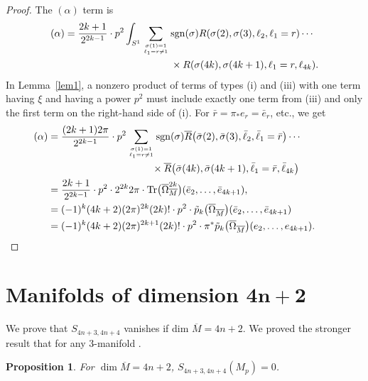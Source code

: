 \documentclass[10pt,a4paper]{amsart}
\numberwithin{equation}{section}
\newtheorem{Proposition}[Theorem]{Proposition}
\theoremstyle{definition}
\newcommand{\Tr}{{\rm Tr}}
\newcommand{\bo}{\overline\Omega}
\newcommand{\bom}{\bo_{\overline M}}
\newcommand{\bxi}{\xi}
\newcommand{\br}{ R}
\newcommand{\ocs}{\widetilde{{\rm CS}}}
\newcommand{\sgn}{{\rm sgn}}
\newcommand{\ints}{\int_{S^1}}
\newcommand{\om}{\overline{M}}
\newcommand{\omp}{M_p}
\begin{document}
\begin{proof}
The $(\alpha)$ term is
\begin{align*}
\begin{split}
(\alpha)= \frac{2k+1}{2^{2k-1}}\cdot p^2\ints \sum_{\sigma(1) = 1\atop \ell_1 = r\neq 1}{}& \sgn(\sigma)
\br(\sigma(2), \sigma(3), \ell_2, \ell_1 = r)\cdots\\
& \times
 \br(\sigma(4k),\sigma(4k+1), \ell_1 =r, \ell_{4k}).\nonumber
\end{split}
 \end{align*}
 In Lemma~\ref{lem1},
 a nonzero product of terms of types (i) and (iii)
 with one term having $\bxi$ and having a power $p^2$ must
include exactly one term from (iii) and only the first term on the right-hand side of (i).
For $\bar r = \pi_* e_r = \bar e_r$, etc., we get
 \begin{align*}(\alpha)
&= \frac{(2k+1)2\pi}{2^{2k-1}}\cdot p^2
 \sum_{\sigma(1) = 1\atop \ell_1 = r\neq 1} \sgn(\sigma)
\overline{R}\bigl(\bar\sigma(2), \bar\sigma(3), \bar\ell_2, \bar\ell_1 = \bar r\bigr)\cdots \\
&\hphantom{= \frac{(2k+1)2\pi}{2^{2k-1}}\cdot p^2
 \sum_{\sigma(1) = 1\atop \ell_1 = r\neq 1}}{}
\times
 \overline{R}\bigl(\bar\sigma(4k),\bar\sigma(4k+1), \bar\ell_1 =\bar r, \bar \ell_{4k}\bigr)\nonumber\\
 &= \frac{2k+1}{2^{2k-1}}\cdot p^2 \cdot 2^{2k}2\pi\cdot \Tr\bigl(\bom^{2k}\bigr)(\bar e_2,\dots, \bar e_{4k+1}),\\
 &= (-1)^k (4k+2)(2\pi)^{2k}(2k)!\cdot p^2 \cdot \tilde p_k\bigl(\bom\bigr)
 (\bar e_2,\dots, \bar e_{4k+1})\\
 &= (-1)^k (4k+2)(2\pi)^{2k+1}(2k)!\cdot
p^2 \cdot \pi^* \tilde p_k\bigl(\bom\bigr)
 (e_2,\dots, e_{4k+1}).\tag*{\qed}
 \end{align*}\renewcommand{\qed}{}
\end{proof}

\section[Manifolds of dimension 4n+2]{Manifolds of dimension $\boldsymbol{4n+2}$}\label{appb}

We prove that $S_{4n+3, 4n+4}$ vanishes if dim $\om = 4n+2$. We proved the stronger result that \smash{$\ocs{}^{\rm W}_{3} = 0$} for any $3$-manifold \cite[Proposition~2.7]{MRT4}.

\begin{Proposition} For $\dim\om = 4n+2$, $S_{4n+3,4n+4}(\omp) = 0$.
\end{Proposition}
\end{document}
